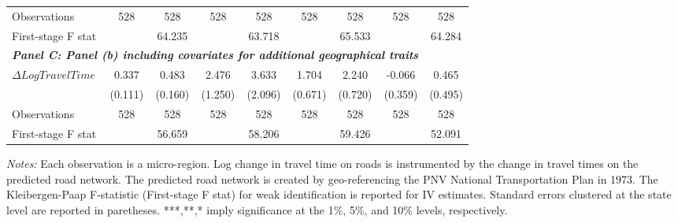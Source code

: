 \begin{table}[htbp]
{\begin{tabular}{l*{8}{c}}
Observations        &         528         &         528         &         528         &         528         &         528         &         528         &         528         &         528         \\
First-stage F stat  &                     &      64.235         &                     &      63.718         &                     &      65.533         &                     &      64.284         \\
\hline

\multicolumn{8}{l}{\linebreak \textbf{\textit{Panel C: Panel (b) including covariates for additional geographical traits}}} \\
$\Delta Log Travel Time$&       0.337\sym{***}&       0.483\sym{***}&       2.476\sym{*}  &       3.633\sym{*}  &       1.704\sym{**} &       2.240\sym{***}&      -0.066         &       0.465         \\
&     (0.111)         &     (0.160)         &     (1.250)         &     (2.096)         &     (0.671)         &     (0.720)         &     (0.359)         &     (0.495)         \\

Observations        &         528         &         528         &         528         &         528         &         528         &         528         &         528         &         528         \\
First-stage F stat  &                     &      56.659         &                     &      58.206         &                     &      59.426         &                     &      52.091         \\
\hline\hline
\end{tabular}}
\endgroup
\begin{minipage}{\linewidth}
    \vspace{0.1cm}
    {\footnotesize \textit{Notes: }  Each observation is a micro-region. Log change in travel time on roads is instrumented by the change in travel times on the predicted road network. The predicted road network is created by geo-referencing the PNV National Transportation Plan in 1973. The Kleibergen-Paap F-statistic (First-stage F stat) for weak identification is reported for IV estimates. Standard errors clustered at the state level are reported in paretheses. ***,**,* imply significance at the 1\%, 5\%, and 10\% levels, respectively.}
\end{minipage}
\end{table}
